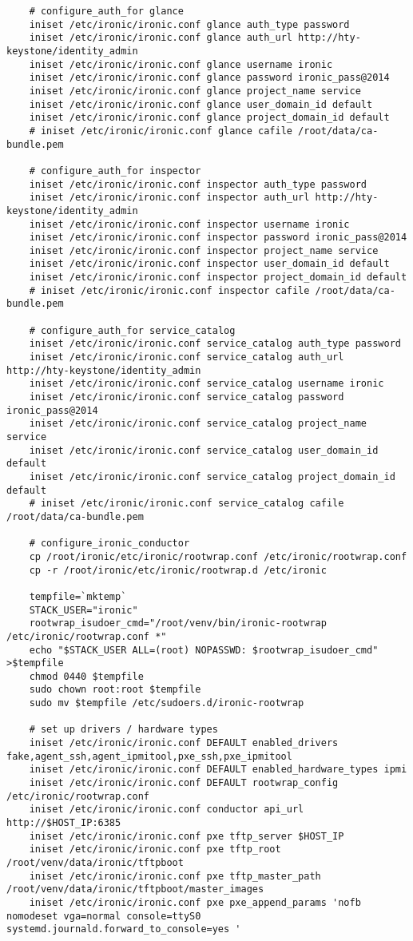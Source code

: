 \documentclass[a4paper,left=1.5cm,right=1.5cm,11pt]{article}
\begin{document}
\begin{lstlisting}
    # configure_auth_for glance
	iniset /etc/ironic/ironic.conf glance auth_type password
    iniset /etc/ironic/ironic.conf glance auth_url http://hty-keystone/identity_admin
    iniset /etc/ironic/ironic.conf glance username ironic
    iniset /etc/ironic/ironic.conf glance password ironic_pass@2014
    iniset /etc/ironic/ironic.conf glance project_name service
    iniset /etc/ironic/ironic.conf glance user_domain_id default
    iniset /etc/ironic/ironic.conf glance project_domain_id default
    # iniset /etc/ironic/ironic.conf glance cafile /root/data/ca-bundle.pem

	# configure_auth_for inspector
	iniset /etc/ironic/ironic.conf inspector auth_type password
    iniset /etc/ironic/ironic.conf inspector auth_url http://hty-keystone/identity_admin
    iniset /etc/ironic/ironic.conf inspector username ironic
    iniset /etc/ironic/ironic.conf inspector password ironic_pass@2014
    iniset /etc/ironic/ironic.conf inspector project_name service
    iniset /etc/ironic/ironic.conf inspector user_domain_id default
    iniset /etc/ironic/ironic.conf inspector project_domain_id default
    # iniset /etc/ironic/ironic.conf inspector cafile /root/data/ca-bundle.pem

	# configure_auth_for service_catalog
	iniset /etc/ironic/ironic.conf service_catalog auth_type password
    iniset /etc/ironic/ironic.conf service_catalog auth_url http://hty-keystone/identity_admin
    iniset /etc/ironic/ironic.conf service_catalog username ironic
    iniset /etc/ironic/ironic.conf service_catalog password ironic_pass@2014
    iniset /etc/ironic/ironic.conf service_catalog project_name service
    iniset /etc/ironic/ironic.conf service_catalog user_domain_id default
    iniset /etc/ironic/ironic.conf service_catalog project_domain_id default
    # iniset /etc/ironic/ironic.conf service_catalog cafile /root/data/ca-bundle.pem

	# configure_ironic_conductor
    cp /root/ironic/etc/ironic/rootwrap.conf /etc/ironic/rootwrap.conf
    cp -r /root/ironic/etc/ironic/rootwrap.d /etc/ironic

	tempfile=`mktemp`
	STACK_USER="ironic"
	rootwrap_isudoer_cmd="/root/venv/bin/ironic-rootwrap /etc/ironic/rootwrap.conf *"
	echo "$STACK_USER ALL=(root) NOPASSWD: $rootwrap_isudoer_cmd" >$tempfile
    chmod 0440 $tempfile
    sudo chown root:root $tempfile
    sudo mv $tempfile /etc/sudoers.d/ironic-rootwrap

	# set up drivers / hardware types
    iniset /etc/ironic/ironic.conf DEFAULT enabled_drivers fake,agent_ssh,agent_ipmitool,pxe_ssh,pxe_ipmitool
    iniset /etc/ironic/ironic.conf DEFAULT enabled_hardware_types ipmi
    iniset /etc/ironic/ironic.conf DEFAULT rootwrap_config /etc/ironic/rootwrap.conf
    iniset /etc/ironic/ironic.conf conductor api_url http://$HOST_IP:6385
	iniset /etc/ironic/ironic.conf pxe tftp_server $HOST_IP
    iniset /etc/ironic/ironic.conf pxe tftp_root /root/venv/data/ironic/tftpboot
    iniset /etc/ironic/ironic.conf pxe tftp_master_path /root/venv/data/ironic/tftpboot/master_images
	iniset /etc/ironic/ironic.conf pxe pxe_append_params 'nofb nomodeset vga=normal console=ttyS0 systemd.journald.forward_to_console=yes '


\end{lstlisting}
\end{document}
